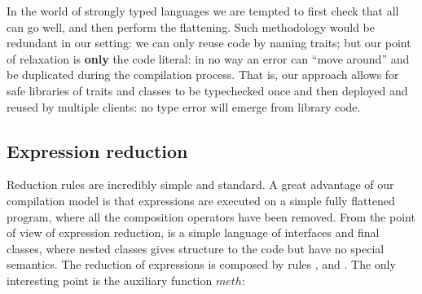 %
%
%
%



\noindent 
In the world of strongly typed languages we are tempted to
first check that all can go well, and then perform the flattening. 
Such methodology would be redundant in our setting: we can only reuse code by naming traits; but our point of relaxation is {\bf only} the code literal: in no way an error can ``move around'' and be duplicated during the compilation process.
That is, our approach allows for safe libraries of traits and classes to be typechecked once and then deployed and reused by multiple clients: no type error will emerge from library code.


\saveSpace
\subsection{Expression reduction}
\saveSpace
Reduction rules are incredibly simple and standard.
A great advantage of our compilation model is that expressions are executed on
a simple fully flattened program, 
where all the composition operators have been removed.
From the point of view of expression reduction, \name is a simple language of 
interfaces and final classes, where nested classes gives structure to the code but have no special semantics.
The reduction of expressions is composed by rules
, and .
The only interesting point is the auxiliary function $\mathit{meth}$:


